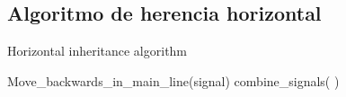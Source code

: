 \subsection{Algoritmo de herencia horizontal}

    \lipsum[1-3]

    \begin{algorithm}[hbt!]
        \caption{Horizontal inheritance algorithm}\label{alg:horizontal}
        \DontPrintSemicolon
        \SetNoFillComment
        \LinesNotNumbered 
        {
            {
                {
                    Move\_backwards\_in\_main\_line(signal)
                }
                \Else 
                {
                    combine\_signals( )
                }
            }
        }
        \KwResult{[Signals]} 
    \end{algorithm}
            
    \lipsum[1-3]